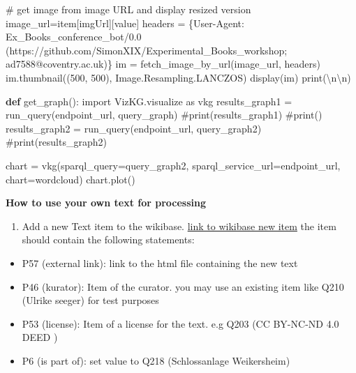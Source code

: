 \documentclass[
  letterpaper,
]{book}
\newenvironment{Shaded}{\begin{snugshade}}{\end{snugshade}}
\newcommand{\BuiltInTok}[1]{\textcolor[rgb]{0.00,0.23,0.31}{#1}}
\newcommand{\CharTok}[1]{\textcolor[rgb]{0.13,0.47,0.30}{#1}}
\newcommand{\CommentTok}[1]{\textcolor[rgb]{0.37,0.37,0.37}{#1}}
\newcommand{\DecValTok}[1]{\textcolor[rgb]{0.68,0.00,0.00}{#1}}
\newcommand{\ImportTok}[1]{\textcolor[rgb]{0.00,0.46,0.62}{#1}}
\newcommand{\KeywordTok}[1]{\textcolor[rgb]{0.00,0.23,0.31}{\textbf{#1}}}
\newcommand{\NormalTok}[1]{\textcolor[rgb]{0.00,0.23,0.31}{#1}}
\newcommand{\OperatorTok}[1]{\textcolor[rgb]{0.37,0.37,0.37}{#1}}
\newcommand{\StringTok}[1]{\textcolor[rgb]{0.13,0.47,0.30}{#1}}
\providecommand{\tightlist}{%
  \setlength{\itemsep}{0pt}\setlength{\parskip}{0pt}}\usepackage{longtable,booktabs,array}
\begin{document}
\begin{Shaded}
\begin{Highlighting}[]
      \CommentTok{\# get image from image URL and display resized version}
\NormalTok{      image\_url}\OperatorTok{=}\NormalTok{item[}\StringTok{\textquotesingle{}imgUrl\textquotesingle{}}\NormalTok{][}\StringTok{\textquotesingle{}value\textquotesingle{}}\NormalTok{]}
\NormalTok{      headers }\OperatorTok{=}\NormalTok{ \{}\StringTok{\textquotesingle{}User{-}Agent\textquotesingle{}}\NormalTok{: }\StringTok{\textquotesingle{}Ex\_Books\_conference\_bot/0.0 (https://github.com/SimonXIX/Experimental\_Books\_workshop; ad7588@coventry.ac.uk)\textquotesingle{}}\NormalTok{\}}
\NormalTok{      im }\OperatorTok{=}\NormalTok{ fetch\_image\_by\_url(image\_url, headers)}
\NormalTok{      im.thumbnail((}\DecValTok{500}\NormalTok{, }\DecValTok{500}\NormalTok{), Image.Resampling.LANCZOS)}
\NormalTok{      display(im)}
      \BuiltInTok{print}\NormalTok{(}\StringTok{\textquotesingle{}}\CharTok{\textbackslash{}n\textbackslash{}n}\StringTok{\textquotesingle{}}\NormalTok{)}

\KeywordTok{def}\NormalTok{ get\_graph():}
    \ImportTok{import}\NormalTok{ VizKG.visualize }\ImportTok{as}\NormalTok{ vkg}
\NormalTok{    results\_graph1 }\OperatorTok{=}\NormalTok{ run\_query(endpoint\_url, query\_graph)}
    \CommentTok{\#print(results\_graph1)}
    \CommentTok{\#print(\textquotesingle{}{-}{-}{-}\textquotesingle{})}
\NormalTok{    results\_graph2 }\OperatorTok{=}\NormalTok{ run\_query(endpoint\_url, query\_graph2)}
    \CommentTok{\#print(results\_graph2)}

\NormalTok{    chart }\OperatorTok{=}\NormalTok{ vkg(sparql\_query}\OperatorTok{=}\NormalTok{query\_graph2, sparql\_service\_url}\OperatorTok{=}\NormalTok{endpoint\_url, chart}\OperatorTok{=}\StringTok{\textquotesingle{}wordcloud\textquotesingle{}}\NormalTok{)}
\NormalTok{    chart.plot()}
\end{Highlighting}
\end{Shaded}

\textbf{How to use your own text for processing}

\begin{enumerate}
\def\labelenumi{\arabic{enumi}.}
\tightlist
\item
  Add a new Text item to the wikibase.
  \href{https://computational-publishing-service.wikibase.cloud/wiki/Special:NewItem}{link
  to wikibase new item} the item should contain the following
  statements:
\end{enumerate}

\begin{itemize}
\tightlist
\item
  P57 (external link): link to the html file containing the new text
\item
  P46 (kurator): Item of the curator. you may use an existing item like
  Q210 (Ulrike seeger) for test purposes
\item
  P53 (license): Item of a license for the text. e.g Q203 (CC BY-NC-ND
  4.0 DEED )
\item
  P6 (is part of): set value to Q218 (Schlossanlage Weikersheim)
\end{itemize}
\end{document}
